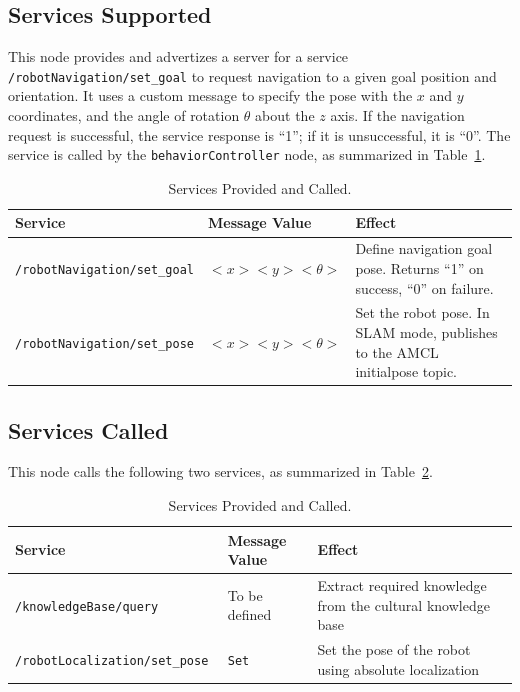 \documentclass{CSSRforAfrica}
\begin{document}
\subsection*{Services Supported}
This node provides and advertizes a server for a service \verb|/robotNavigation/set_goal| to request navigation to a given goal position and orientation. It uses a custom message to specify the pose with the $x$ and $y$ coordinates, and the angle of rotation $\theta$ about the $z$ axis. If the navigation request is successful, the service response is “1”; if it is unsuccessful, it is “0”. The service is called by the \verb|behaviorController| node, as summarized in Table~\ref{tab:services supported}.

\begin{table}[H]
\centering
\caption{Services Provided and Called.}
\label{tab:services supported}
\begin{tabularx}{\textwidth}{|l|l|X|}
\hline
\textbf{Service} & \textbf{Message Value} & \textbf{Effect} \\ \hline
\verb|/robotNavigation/set_goal| & \(<x> <y> <\theta>\) & Define navigation goal pose. Returns ``1'' on success, ``0'' on failure. \\ \hline
\verb|/robotNavigation/set_pose| & \(<x> <y> <\theta>\) & Set the robot pose. In SLAM mode, publishes to the AMCL initialpose topic. \\ \hline
\end{tabularx}
\end{table}

\subsection*{Services Called}
This node calls the following two services, as summarized in Table~\ref{tab:services called}.

\begin{table}[H]
\centering
\caption{Services Provided and Called.}
\label{tab:services called}
\begin{tabularx}{\textwidth}{|l|l|X|}
\hline
\textbf{Service} & \textbf{Message Value} & \textbf{Effect} \\ \hline
\verb|/knowledgeBase/query | & To be defined & Extract required knowledge from the cultural
knowledge base \\ \hline
\verb|/robotLocalization/set_pose  | & \verb|Set| & Set the pose of the robot using absolute localization \\ \hline
\end{tabularx}
\end{table}
\end{document}
